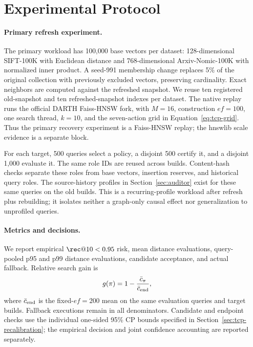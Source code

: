 \section{Experimental Protocol}
\label{sec:methodology}

\paragraph{Primary refresh experiment.}
The primary workload has 100,000 base vectors per dataset: 128-dimensional SIFT-100K with Euclidean distance and 768-dimensional Arxiv-Nomic-100K with normalized inner product. A seed-991 membership change replaces 5\% of the original collection with previously excluded vectors, preserving cardinality. Exact neighbors are computed against the refreshed snapshot. We reuse ten registered old-snapshot and ten refreshed-snapshot indexes per dataset. The native replay runs the official DARTH Faiss-HNSW fork, with $M=16$, construction $ef=100$, one search thread, $k=10$, and the seven-action grid in Equation~\eqref{eq:tcp-grid}. Thus the primary recovery experiment is a Faiss-HNSW replay; the hnswlib scale evidence is a separate block.

For each target, 500 queries select a policy, a disjoint 500 certify it, and a disjoint 1,000 evaluate it. The same role IDs are reused across builds. Content-hash checks separate these roles from base vectors, insertion reserves, and historical query roles. The source-history profiles in Section~\ref{sec:auditor} exist for these same queries on the old builds. This is a recurring-profile workload after refresh plus rebuilding; it isolates neither a graph-only causal effect nor generalization to unprofiled queries.

\paragraph{Metrics and decisions.}
We report empirical $\rec@10<0.95$ risk, mean distance evaluations, query-pooled p95 and p99 distance evaluations, candidate acceptance, and actual fallback. Relative search gain is
\begin{equation}
 g(\pi)=1-\frac{\bar c_\pi}{\bar c_{\rm end}},
 \label{eq:gain}
\end{equation}
where $\bar c_{\rm end}$ is the fixed-$ef=200$ mean on the same evaluation queries and target builds. Fallback executions remain in all denominators. Candidate and endpoint checks use the individual one-sided 95\% CP bounds specified in Section~\ref{sec:tcp-recalibration}; the empirical decision and joint confidence accounting are reported separately.

